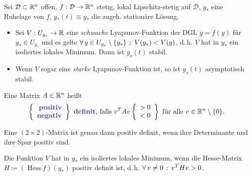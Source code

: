 \documentclass{cheat-sheet}
\newcommand{\D}{\mathcal{D}}
\DeclareMathOperator{\Hess}{Hess} %
\begin{document}
\begin{satz}
  Sei $\D \subset \R^n$ offen, $f : \D \to \R^n$ stetig, lokal Lipschitz-stetig auf $\D$, $y_{*}$ eine Ruhelage von $f$, $y_{*}(t) \equiv y_{*}$ die zugeh. stationäre Lösung.
  \begin{itemize}
    \item Sei $V : U_{y_{*}} \to \mathbb{R}$ eine \textit{schwache} Lyapunov-Funktion der DGL $\dot{y} = f(y)$ für $y_{*} \in U_{y_{*}}$ und es gelte $\forall \, {y \in U_{y_{*}} \setminus \{ y_{*} \}} \,:\, V(y_{*}) < V(y)$, d.\,h. $V$ hat in $y_{*}$ ein isoliertes lokales Minimum. Dann ist $y_s(t)$ stabil.
    \item Wenn $V$ sogar eine \textit{starke} Lyapunov-Funktion ist, so ist $y_s(t)$ asymptotisch stabil.
  \end{itemize}
\end{satz}

\begin{defn}
  Eine Matrix $A \in \mathbb{R}^n$ heißt
  \[
    \left\{ \begin{array}{rlll}
      \text{\emph{positiv}} \\
      \text{\emph{negativ}}
    \end{array} \right\}
    \text{ \emph{definit}, falls }
    v^T A v
    \left\{ \begin{array}{rlll}
      > 0 \\
      < 0
    \end{array} \right\}
    \text{ für alle }
    v \in \R^n \setminus \{ 0 \}.
  \]
\end{defn}

\begin{bem}
  Eine $(2 \times 2)$-Matrix ist genau dann positiv definit, wenn ihre Determinante und ihre Spur positiv sind.
\end{bem}

\begin{bem}
  Die Funktion $V$ hat in $y_{*}$ ein isoliertes lokales Minimum, wenn die Hesse-Matrix $H \coloneqq (\Hess f)(y_{*})$ positiv definit ist, d.\,h. $\forall \, {v \not= 0} \,:\, v^T H v > 0$.
\end{bem}



\end{document}
